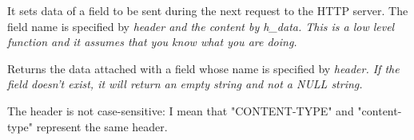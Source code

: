 


It sets data of a field to be sent during the next request to the HTTP server. The field
name is specified by \it{header} and the content by \it{h\_data}.
This is a low level function and it assumes that you know what you are doing.



Returns the data attached with a field whose name is specified by \it{header}.
If the field doesn't exist, it will return an empty string and not a NULL string.


The header is not case-sensitive: I mean that "CONTENT-TYPE" and "content-type" 
represent the same header.
